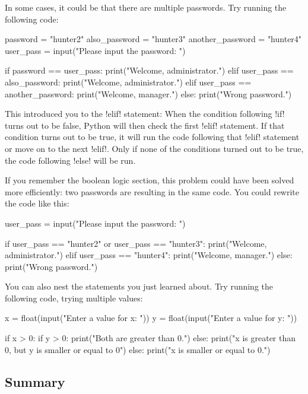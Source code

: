\documentclass[11pt]{cselabheader}
\begin{document}
In some cases, it could be that there are multiple passwords. Try running the
following code:

\begin{python3code}
password = "hunter2"
also_password = "hunter3"
another_password = "hunter4"
user_pass = input("Please input the password: ")

if password == user_pass:
    print("Welcome, administrator.")
elif user_pass == also_password:
    print("Welcome, administrator.")
elif user_pass == another_password:
    print("Welcome, manager.")
else:
    print("Wrong password.")
\end{python3code}

This introduced you to the \pythoninline!elif! statement: When the condition
following \pythoninline!if! turns out to be false, Python will then check the first
\pythoninline!elif! statement. If that condition turns out to be true, it will run
the code following that \pythoninline!elif! statement or move on to the next
\pythoninline!elif!. Only if none of the conditions turned out to be true, the code
following \pythoninline!else! will be run.

If you remember the boolean logic section, this problem could have been solved
more efficiently: two passwords are resulting in the same code. You could
rewrite the code like this:

\begin{python3code}
user_pass = input("Please input the password: ")

if user_pass == "hunter2" or user_pass == "hunter3":
    print("Welcome, administrator.")
elif user_pass == "hunter4":
    print("Welcome, manager.")
else:
    print("Wrong password.")
\end{python3code}

You can also nest the statements you just learned about. Try running the
following code, trying multiple values:

\begin{python3code}
x = float(input("Enter a value for x: "))
y = float(input("Enter a value for y: "))

if x > 0:
    if y > 0:
        print("Both are greater than 0.")
    else:
        print("x is greater than 0, but y is smaller or equal to 0")
else:
    print("x is smaller or equal to 0.")
\end{python3code}

\subsection{Summary}
\end{document}
